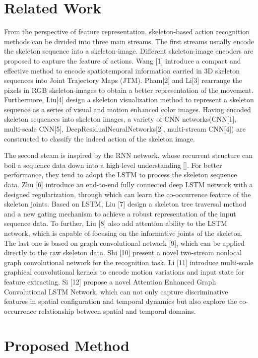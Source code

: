 \documentclass{bmvc2k}
\begin{document}
\section{Related Work}
From the perspective of feature representation, skeleton-based action recognition methods can be divided into three main streams. 
The first streams usually encode the skeleton sequence into a skeleton-image. Different skeleton-image encoders are proposed to capture the feature of actions. Wang [1] introduce a compact and effective method to encode spatiotemporal information carried in 3D skeleton sequences into Joint Trajectory Maps (JTM). Pham[2] and Li[3] rearrange the pixels in RGB skeleton-images to obtain a better representation of the movement. Furthermore, Liu[4] design a skeleton visualization method to represent a skeleton sequence as a series of visual and motion enhanced color images. Having encoded skeleton sequences into skeleton images, a variety of CNN networks(CNN[1], multi-scale CNN[5], DeepResidualNeuralNetworks[2], multi-stream CNN[4]) are constructed to classify the indeed action of the skeleton image. 

The second steam is inspired by the RNN network, whose recurrent structure can boil a sequence data down into a high-level understanding []. For better performance, they tend to adopt the LSTM to process the skeleton sequence data. Zhu [6] introduce an end-to-end fully connected deep LSTM network with a designed regularization, through which can learn the co-occurrence feature of the skeleton joints. Based on LSTM, Liu [7] design a skeleton tree traversal method and a new gating mechanism to achieve a robust representation of the input sequence data. To further, Liu [8] also add attention ability to the LSTM network, which is capable of focusing on the informative joints of the skeleton.
The last one is based on graph convolutional network [9], which can be applied directly to the raw skeleton data. Shi [10] present a novel two-stream nonlocal graph convolutional network for the recognition task. Li [11] introduce multi-scale graphical convolutional kernels to encode motion variations and input state for feature extracting. Si [12] propose a novel Attention Enhanced Graph Convolutional LSTM Network, which can not only capture discriminative features in spatial configuration and temporal dynamics but also explore the co-occurrence relationship between spatial and temporal domains.

\section{Proposed Method}
\end{document}

